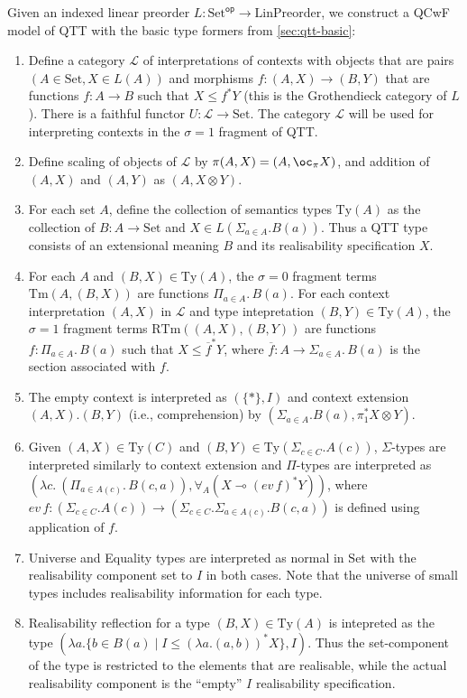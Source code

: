 \documentclass[acmsmall,review,screen,anonymous]{acmart}
\newcommand{\Ty}{\mathrm{Ty}}
\newcommand{\RTm}{\mathrm{RTm}}
\newcommand{\Tm}{\mathrm{Tm}}
\newcommand{\Set}{\mathrm{Set}}
\newcommand{\cat}[1]{\mathcal{#1}}
\newcommand{\op}{\mathsf{op}}
\newcommand{\LinPreorder}{\mathrm{LinPreorder}}
\begin{document}
Given an indexed linear preorder $L : \Set^\op \to \LinPreorder$, we
construct a QCwF model of QTT with the basic type formers from
\autoref{sec:qtt-basic}:
\begin{enumerate}
\item Define a category $\cat{L}$ of interpretations of contexts with
  objects that are pairs $(A \in \Set, X \in L(A))$ and morphisms
  $f : (A,X) \to (B, Y)$ that are functions $f : A \to B$ such that
  $X \leq f^*Y$ (this is the Grothendieck category of $L$). There is a
  faithful functor $U : \cat{L} \to \Set$. The category $\cat{L}$ will
  be used for interpreting contexts in the $\sigma = 1$ fragment of
  QTT.
\item Define scaling of objects of $\cat{L}$ by
  $\pi(A,X) = (A, \oc_\pi X)$, and addition of $(A, X)$ and $(A, Y)$
  as $(A, X \otimes Y)$.
\item For each set $A$, define the collection of semantics types
  $\Ty(A)$ as the collection of $B : A \to \Set$ and
  $X \in L(\Sigma_{a \in A}.B(a))$. Thus a QTT type consists of an
  extensional meaning $B$ and its realisability specification $X$.
\item For each $A$ and $(B,X) \in \Ty(A)$, the $\sigma = 0$ fragment
  terms $\Tm(A,(B,X))$ are functions $\Pi_{a \in A}.\,B(a)$. For each
  context interpretation $(A, X)$ in $\cat{L}$ and type intepretation
  $(B,Y) \in \Ty(A)$, the $\sigma = 1$ fragment terms
  $\RTm((A,X),(B,Y))$ are functions $f : \Pi_{a \in A}.\,B(a)$ such
  that $X \leq \overline{f}^*Y$, where
  $\overline{f} : A \to \Sigma_{a \in A}.\,B(a)$ is the section
  associated with $f$.
\item The empty context is interpreted as $(\{*\}, I)$ and context
  extension $(A,X).(B,Y)$ (i.e., comprehension) by
  $(\Sigma_{a \in A}.B(a), \pi_1^* X \otimes Y)$.
\item Given $(A,X) \in \Ty(C)$ and
  $(B,Y) \in \Ty(\Sigma_{c \in C}.A(c))$, $\Sigma$-types are
  interpreted similarly to context extension and $\Pi$-types are
  interpreted as
  $(\lambda c.~(\Pi_{a \in A(c)}.\,B(c,a)), \forall_{A}(X \multimap
  (\mathit{ev}\,f)^*Y))$, where
  $\mathit{ev}\,f : (\Sigma_{c \in C}.A(c)) \to (\Sigma_{c \in
    C}.\Sigma_{a \in A(c)}.B(c,a))$ is defined using application of
  $f$.
\item Universe and Equality types are interpreted as normal in $\Set$
  with the realisability component set to $I$ in both cases. Note that
  the universe of small types includes realisability information for
  each type.
\item Realisability reflection for a type $(B,X) \in \Ty(A)$ is
  intepreted as the type
  $(\lambda a. \{ b \in B(a) \mid I \leq (\lambda a. (a,b))^*X \},
  I)$. Thus the set-component of the type is restricted to the
  elements that are realisable, while the actual realisability
  component is the ``empty'' $I$ realisability specification.
\end{enumerate}
\end{document}

